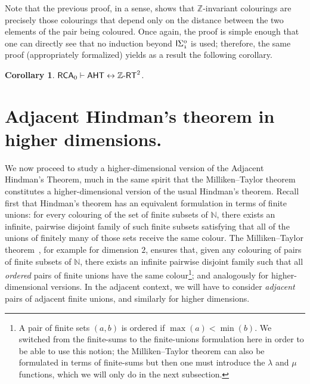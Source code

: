 \documentclass[11pt]{amsart}
\newcommand{\zrt}{\mathnormal{\mathbb Z\text{-}\mathsf{RT}}}
\newcommand{\aht}{\mathnormal{\mathsf{AHT}}}
\newcommand{\rca}{\mathnormal{\mathsf{RCA}}_0}
\newcommand{\isigma}{\mathnormal{\mathsf{I}\mathrm{\Sigma}_1^0}}
\newtheorem{corollary}[theorem]{Corollary}
\theoremstyle{definition}
\begin{document}
Note that the previous proof, in a sense, shows that $\mathbb Z$-invariant colourings are precisely those colourings that depend only on the distance between the two elements of the pair being coloured. Once again, the proof is simple enough that one can directly see that no induction beyond $\isigma$ is used; therefore, the same proof (appropriately formalized) yields as a result the following corollary.

\begin{corollary}
$\rca\vdash\aht\leftrightarrow\zrt^2$.
\end{corollary}

\section{Adjacent Hindman's theorem in higher dimensions.}

We now proceed to study a higher-dimensional version of the Adjacent Hindman's Theorem, much in the same spirit that the Milliken--Taylor theorem constitutes a higher-dimensional version of the usual Hindman's theorem. Recall first that Hindman's theorem has an equivalent formulation in terms of finite unions: for every colouring of the set of finite subsets of $\mathbb N$, there exists an infinite, pairwise disjoint family of such finite subsets satisfying that all of the unions of finitely many of those sets receive the same colour. The Milliken--Taylor theorem~\cite{milliken-thm,taylor-thm}, for example for dimension $2$, ensures that, given any colouring of pairs of finite subsets of $\mathbb N$, there exists an infinite pairwise disjoint family such that all {\it ordered} pairs of finite unions have the same colour\footnote{A pair of finite sets $(a,b)$ is ordered if $\max(a)<\min(b)$. We switched from the finite-sums to the finite-unions formulation here in order to be able to use this notion; the Milliken--Taylor theorem can also be formulated in terms of finite-sums but then one must introduce the $\lambda$ and $\mu$ functions, which we will only do in the next subsection.}; and analogously for higher-dimensional versions. In the adjacent context, we will have to consider {\it adjacent} pairs of adjacent finite unions, and similarly for higher dimensions.
\end{document}
